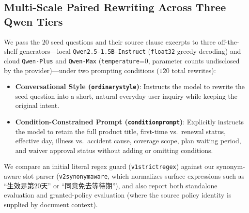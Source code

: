 \documentclass[10pt,twocolumn]{article}
\renewcommand{\_}{\textunderscore\allowbreak}
\begin{document}
\subsection{Multi-Scale Paired Rewriting Across Three Qwen Tiers}
We pass the $20$ seed questions and their source clause excerpts to three off-the-shelf generators---local \texttt{Qwen2.5-1.5B-Instruct} (\texttt{float32} greedy decoding) and cloud \texttt{Qwen-Plus} and \texttt{Qwen-Max} (\texttt{temperature}=0, parameter counts undisclosed by the provider)---under two prompting conditions ($120$ total rewrites):
\begin{itemize}[leftmargin=*,nosep]
  \item \textbf{Conversational Style (\texttt{ordinary\_style})}: Instructs the model to rewrite the seed question into a short, natural everyday user inquiry while keeping the original intent.
  \item \textbf{Condition-Constrained Prompt (\texttt{condition\_prompt})}: Explicitly instructs the model to retain the full product title, first-time vs.\ renewal status, effective day, illness vs.\ accident cause, coverage scope, plan waiting period, and waiver approval status without adding or omitting conditions.
\end{itemize}

We compare an initial literal regex guard (\texttt{v1\_strict\_regex}) against our synonym-aware slot parser (\texttt{v2\_synonym\_aware}, which normalizes surface expressions such as ``生效是第20天'' or ``同意免去等待期''), and also report both standalone evaluation and granted-policy evaluation (where the source policy identity is supplied by document context).
\end{document}
